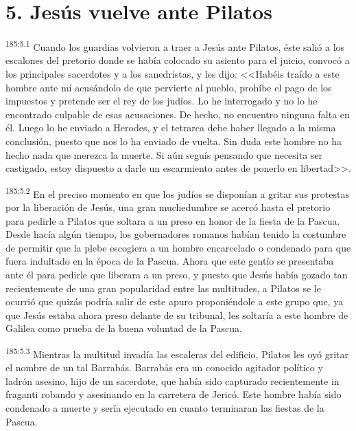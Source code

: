 \section*{5. Jesús vuelve ante Pilatos}
\par 
\textsuperscript{185:5.1} Cuando los guardias volvieron a traer a Jesús ante Pilatos, éste salió a los escalones del pretorio donde se había colocado su asiento para el juicio, convocó a los principales sacerdotes y a los sanedristas, y les dijo: <<Habéis traído a este hombre ante mí acusándolo de que pervierte al pueblo, prohíbe el pago de los impuestos y pretende ser el rey de los judíos. Lo he interrogado y no lo he encontrado culpable de esas acusaciones. De hecho, no encuentro ninguna falta en él. Luego lo he enviado a Herodes, y el tetrarca debe haber llegado a la misma conclusión, puesto que nos lo ha enviado de vuelta. Sin duda este hombre no ha hecho nada que merezca la muerte. Si aún seguís pensando que necesita ser castigado, estoy dispuesto a darle un escarmiento antes de ponerlo en libertad>>.

\par 
\textsuperscript{185:5.2} En el preciso momento en que los judíos se disponían a gritar sus protestas por la liberación de Jesús, una gran muchedumbre se acercó hasta el pretorio para pedirle a Pilatos que soltara a un preso en honor de la fiesta de la Pascua. Desde hacía algún tiempo, los gobernadores romanos habían tenido la costumbre de permitir que la plebe escogiera a un hombre encarcelado o condenado para que fuera indultado en la época de la Pascua. Ahora que este gentío se presentaba ante él para pedirle que liberara a un preso, y puesto que Jesús había gozado tan recientemente de una gran popularidad entre las multitudes, a Pilatos se le ocurrió que quizás podría salir de este apuro proponiéndole a este grupo que, ya que Jesús estaba ahora preso delante de su tribunal, les soltaría a este hombre de Galilea como prueba de la buena voluntad de la Pascua.

\par 
\textsuperscript{185:5.3} Mientras la multitud invadía las escaleras del edificio, Pilatos les oyó gritar el nombre de un tal Barrabás. Barrabás era un conocido agitador político y ladrón asesino, hijo de un sacerdote, que había sido capturado recientemente in fraganti robando y asesinando en la carretera de Jericó. Este hombre había sido condenado a muerte y sería ejecutado en cuanto terminaran las fiestas de la Pascua.

